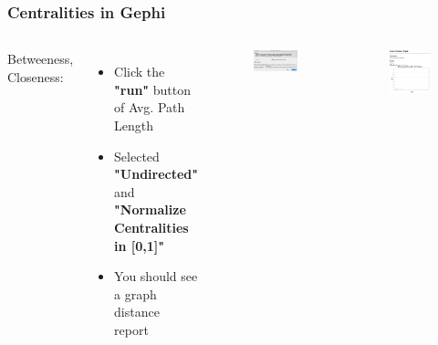 \documentclass[10pt]{beamer}
\begin{document}
\begin{frame}
\frametitle{Centralities in Gephi}

\begin{columns}[c] 
Betweeness, Closeness:
\begin{itemize}
\item Click the \textbf{"run"} button of Avg. Path Length
\item Selected \textbf{"Undirected"} and \textbf{"Normalize Centralities in [0,1]"}
\item You should see a graph distance report
\end{itemize}

\begin{figure}
\includegraphics[width=0.6\linewidth]{figures/centrality_choice.png}
\end{figure}
\begin{figure}
\includegraphics[width=0.6\linewidth]{figures/betweeness.png}
\end{figure}
\end{columns}
\end{frame}
\end{document}

